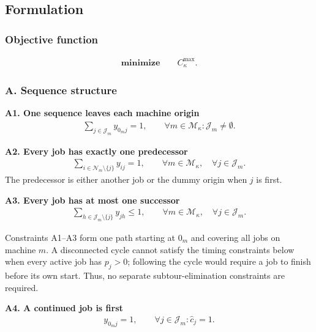 \documentclass{article}
\begin{document}
\FloatBarrier

\subsection{Formulation}

\subsubsection{Objective function}

\begin{align}
\textbf{minimize}\qquad C^{\max}_{\kappa}.
\label{eq:objective}
\end{align}

\subsubsection{A. Sequence structure}

\noindent\textbf{A1. One sequence leaves each machine origin}
\begin{align}
\sum_{j\in\mathcal{J}_{m}}y_{0_mj}=1,
\qquad
\forall m\in\mathcal{M}_{\kappa}:\mathcal{J}_{m}\neq\emptyset.
\label{eq:A1-origin}
\end{align}

\noindent\textbf{A2. Every job has exactly one predecessor}
\begin{align}
\sum_{i\in\mathcal{N}_{m}\setminus\{j\}}y_{ij}=1,
\qquad
\forall m\in\mathcal{M}_{\kappa},\quad
\forall j\in\mathcal{J}_{m}.
\label{eq:A2-predecessor}
\end{align}
The predecessor is either another job or the dummy origin when $j$ is first.

\noindent\textbf{A3. Every job has at most one successor}
\begin{align}
\sum_{h\in\mathcal{J}_{m}\setminus\{j\}}y_{jh}\leq1,
\qquad
\forall m\in\mathcal{M}_{\kappa},\quad
\forall j\in\mathcal{J}_{m}.
\label{eq:A3-successor}
\end{align}

Constraints A1--A3 form one path starting at $0_m$ and covering all jobs on
machine $m$. A disconnected cycle cannot satisfy the timing constraints below
when every active job has $p_j>0$; following the cycle would require a job to
finish before its own start. Thus, no separate subtour-elimination constraints
are required.

\noindent\textbf{A4. A continued job is first}
\begin{align}
y_{0_mj}=1,
\qquad
\forall j\in\mathcal{J}_{m}:\hat c_j=1.
\label{eq:A4-continuation}
\end{align}
\end{document}
